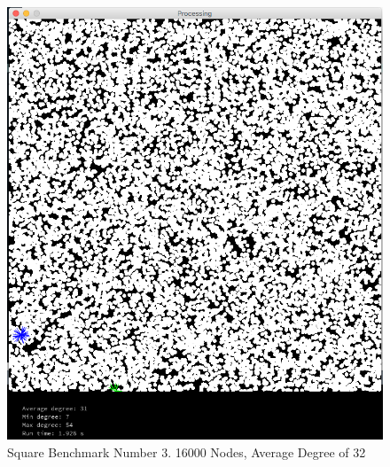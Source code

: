 \documentclass{article}
\begin{document}
\begin{center}
    \begin{figure}
        \includegraphics[scale=0.45]{./images/square_2.png}
        \caption{Square Benchmark Number 3. 16000 Nodes, Average Degree of 32}
        \label{square2}
    \end{figure}
\end{center}
\end{document}

